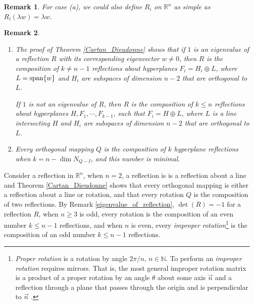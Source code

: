 \documentclass[11pt]{book}
\newtheorem{remark}{Remark}[chapter]
\theoremstyle{definition}
\numberwithin{equation}{chapter}
\begin{document}
\begin{subappendices}
\begin{remark}
For case (a), we could also define $R_i$ on $\mathbb{R}^n$ as simple as $R_i(\lambda w) = \lambda w$.
\end{remark}

\begin{remark}
~\begin{enumerate}[label=(\arabic*)]
    \item The proof of Theorem \ref{Cartan_Dieudonne} shows that if $1$ is an eigenvalue of a reflection $R$ with its corresponding eigenvector $w \neq 0$, then $R$ is the composition of $k \neq n - 1$ reflections about hyperplanes $F_i = H_i \oplus L$, where $L = {\rm span}\{w\}$ and $H_i$ are subspaces of dimension $n - 2$ that are orthogonal to $L$. 
    
    If $1$ is not an  eigenvalue of $R$, then $R$ is the composition of $k \leq n$ reflections about hyperplanes $H, F_1, \cdots, F_{k-1}$, such that $F_i = H \oplus L$, where $L$ is a line intersecting $H$ and  $H_i$ are subspaces of dimension $n - 2$ that are orthogonal to $L$. 
    
    \item Every orthogonal mapping $Q$ is the composition of $k$ hyperplane reflections when $k = n - \dim N_{Q-I}$, and this number is minimal. 
\end{enumerate}
\end{remark}

\medskip

Consider a reflection in $\mathbb{R}^n$, when $n = 2$, a reflection is is a reflection about a line and Theorem \ref{Cartan_Dieudonne} shows that every orthogonal mapping is either a reflection about a line or rotation, and that every rotation $Q$ is the composition of two reflections. By Remark \ref{eigenvalue_of_reflection}, $\det (R) = -1$ for a reflection $R$, when $n \geq 3$ is odd, every rotation is the composition of an even number $k \leq n - 1$ reflections, and when $n$ is even, every {\em improper rotation}\footnote{{\em Proper rotation} is a rotation by angle $2\pi/n$, $n \in \mathbb{N}$. To perform an {\em improper rotation} requires mirrors. That is, the most general improper rotation matrix is a product of a proper rotation by an angle $\theta$ about some axis $\vec{n}$ and a reflection through a plane that passes through the origin and is perpendicular to $\vec{n}$ \cite{36}.} is the composition of an odd number $k \leq n - 1$ reflections.


\end{subappendices}
\end{document}
